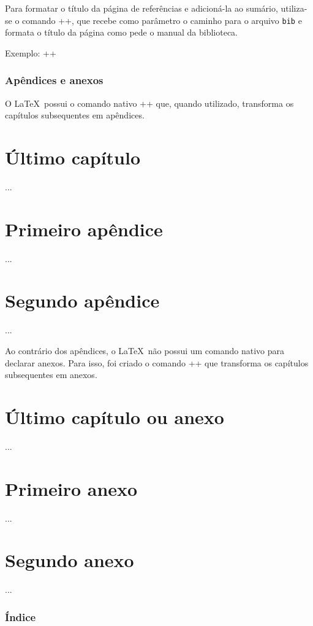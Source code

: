 \documentclass[xindy,rascunho]{fei}
\begin{document}
\begin{teorema}
    Para formatar o título da página de referências e adicioná-la ao sumário, utiliza-se o comando \latexinline++, que recebe como parâmetro o caminho para o arquivo \texttt{bib} e formata o título da página como pede o manual da biblioteca.

    Exemplo: \latexinline++
	
	\subsection{Apêndices e anexos}
	
	O \LaTeX\ possui o comando nativo \latexinline+\appendix+ que, quando utilizado, transforma os capítulos subsequentes em apêndices.
	
	\begin{latexcode}
	\chapter{Último capítulo}
	...
	\appendix
	\chapter{Primeiro apêndice}
	...
	\chapter{Segundo apêndice}
	...
	\end{latexcode}
	
    Ao contrário dos apêndices, o \LaTeX\ não possui um comando nativo para declarar anexos. Para isso, foi criado o comando \latexinline+\anexos+ que transforma os capítulos subsequentes em anexos.
	
	\begin{latexcode}
	\chapter{Último capítulo ou anexo}
	...
	\anexos
	\chapter{Primeiro anexo}
	...
	\chapter{Segundo anexo}
	...
	\end{latexcode}
	
	\subsection{Índice}
	

\end{teorema}
\end{document}
